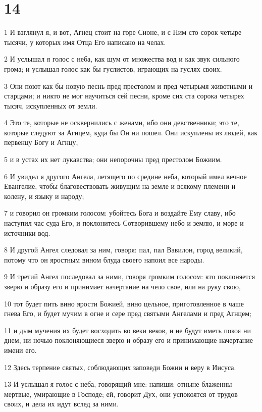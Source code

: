 \chapter{14}

\par 1 И взглянул я, и вот, Агнец стоит на горе Сионе, и с Ним сто сорок четыре тысячи, у которых имя Отца Его написано на челах.
\par 2 И услышал я голос с неба, как шум от множества вод и как звук сильного грома; и услышал голос как бы гуслистов, играющих на гуслях своих.
\par 3 Они поют как бы новую песнь пред престолом и пред четырьмя животными и старцами; и никто не мог научиться сей песни, кроме сих ста сорока четырех тысяч, искупленных от земли.
\par 4 Это те, которые не осквернились с женами, ибо они девственники; это те, которые следуют за Агнцем, куда бы Он ни пошел. Они искуплены из людей, как первенцу Богу и Агнцу,
\par 5 и в устах их нет лукавства; они непорочны пред престолом Божиим.
\par 6 И увидел я другого Ангела, летящего по средине неба, который имел вечное Евангелие, чтобы благовествовать живущим на земле и всякому племени и колену, и языку и народу;
\par 7 и говорил он громким голосом: убойтесь Бога и воздайте Ему славу, ибо наступил час суда Его, и поклонитесь Сотворившему небо и землю, и море и источники вод.
\par 8 И другой Ангел следовал за ним, говоря: пал, пал Вавилон, город великий, потому что он яростным вином блуда своего напоил все народы.
\par 9 И третий Ангел последовал за ними, говоря громким голосом: кто поклоняется зверю и образу его и принимает начертание на чело свое, или на руку свою,
\par 10 тот будет пить вино ярости Божией, вино цельное, приготовленное в чаше гнева Его, и будет мучим в огне и сере пред святыми Ангелами и пред Агнцем;
\par 11 и дым мучения их будет восходить во веки веков, и не будут иметь покоя ни днем, ни ночью поклоняющиеся зверю и образу его и принимающие начертание имени его.
\par 12 Здесь терпение святых, соблюдающих заповеди Божии и веру в Иисуса.
\par 13 И услышал я голос с неба, говорящий мне: напиши: отныне блаженны мертвые, умирающие в Господе; ей, говорит Дух, они успокоятся от трудов своих, и дела их идут вслед за ними.
